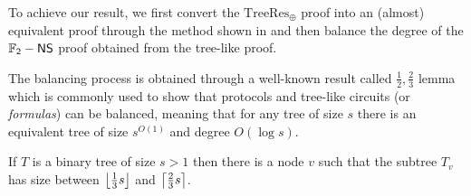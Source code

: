 To achieve our result, we first convert the $\mathrm{TreeRes}_\oplus$ proof into an (almost) equivalent proof through the method shown in  and then balance the degree of the $\mathsf{\mathbb{F}_2-NS}$ proof obtained from the tree-like proof.

The balancing process is obtained through a well-known result called $\frac{1}{2}, \frac{2}{3}$ lemma \cite{13_23_lemma} which is commonly used to show that protocols and tree-like circuits (or \textit{formulas}) can be balanced, meaning that for any tree of size $s$ there is an equivalent tree of size $s^{O(1)}$ and degree $O(\log s)$.

\begin{lemma}
    \label{13_23_lewis}
    If $T$ is a binary tree of size $s > 1$ then there is a node $v$ such that the subtree $T_v$ has size between $\left \lfloor \frac{1}{3} s \right \rfloor$ and $\left \lceil \frac{2}{3} s \right \rceil$.
\end{lemma}

